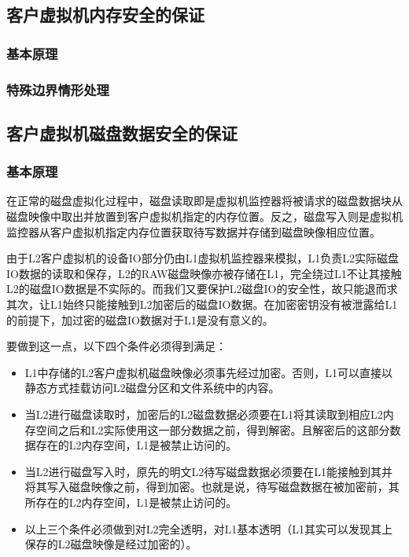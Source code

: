 \subsection{客户虚拟机内存安全的保证}



\subsubsection{基本原理}

\subsubsection{特殊边界情形处理}




\subsection{客户虚拟机磁盘数据安全的保证}

\subsubsection{基本原理}

在正常的磁盘虚拟化过程中，磁盘读取即是虚拟机监控器将被请求的磁盘数据块从磁盘映像中取出并放置到客户虚拟机指定的内存位置。反之，磁盘写入则是虚拟机监控器从客户虚拟机指定内存位置获取待写数据并存储到磁盘映像相应位置。

由于L2客户虚拟机的设备IO部分仍由L1虚拟机监控器来模拟，L1负责L2实际磁盘IO数据的读取和保存，L2的RAW磁盘映像亦被存储在L1，完全绕过L1不让其接触L2的磁盘IO数据是不实际的。而我们又要保护L2磁盘IO的安全性，故只能退而求其次，让L1始终只能接触到L2加密后的磁盘IO数据。在加密密钥没有被泄露给L1的前提下，加过密的磁盘IO数据对于L1是没有意义的。

要做到这一点，以下四个条件必须得到满足：

\begin{itemize}
\item{L1中存储的L2客户虚拟机磁盘映像必须事先经过加密。否则，L1可以直接以静态方式挂载访问L2磁盘分区和文件系统中的内容。}
\item{当L2进行磁盘读取时，加密后的L2磁盘数据必须要在L1将其读取到相应L2内存空间之后和L2实际使用这一部分数据之前，得到解密。且解密后的这部分数据存在的L2内存空间，L1是被禁止访问的。}
\item{当L2进行磁盘写入时，原先的明文L2待写磁盘数据必须要在L1能接触到其并将其写入磁盘映像之前，得到加密。也就是说，待写磁盘数据在被加密前，其所存在的L2内存空间，L1是被禁止访问的。}
\item{以上三个条件必须做到对L2完全透明，对L1基本透明（L1其实可以发现其上保存的L2磁盘映像是经过加密的）。}
\end{itemize}

